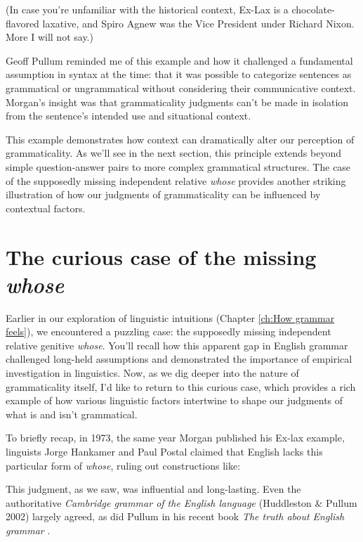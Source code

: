 (In case you're unfamiliar with the historical context, Ex-Lax is a chocolate-flavored laxative, and Spiro Agnew was the Vice President under Richard Nixon. More I will not say.)

Geoff Pullum reminded me of this example and how it challenged a fundamental assumption in syntax at the time: that it was possible to categorize sentences as grammatical or ungrammatical without considering their communicative context. Morgan's insight was that grammaticality judgments can't be made in isolation from the sentence's intended use and situational context.

This example demonstrates how context can dramatically alter our perception of grammaticality. As we'll see in the next section, this principle extends beyond simple question-answer pairs to more complex grammatical structures. The case of the supposedly missing independent relative \textit{whose} provides another striking illustration of how our judgments of grammaticality can be influenced by contextual factors.

\section{The curious case of the missing \textit{whose}}

Earlier in our exploration of linguistic intuitions (Chapter \ref{ch:How grammar feels}), we encountered a puzzling case: the supposedly missing independent relative genitive \textit{whose}. You'll recall how this apparent gap in English grammar challenged long-held assumptions and demonstrated the importance of empirical investigation in linguistics. Now, as we dig deeper into the nature of grammaticality itself, I'd like to return to this curious case, which provides a rich example of how various linguistic factors intertwine to shape our judgments of what is and isn't grammatical.

To briefly recap, in 1973, the same year Morgan published his Ex-lax example, linguists Jorge Hankamer and Paul Postal claimed that English lacks this particular form of \textit{whose}, ruling out constructions like:

\z

This judgment, as we saw, was influential and long-lasting. Even the authoritative \textit{Cambridge grammar of the English language} (Huddleston \& Pullum 2002) largely agreed, as did Pullum in his recent book \textit{The truth about English grammar} \citep{pullum2024truth}.


